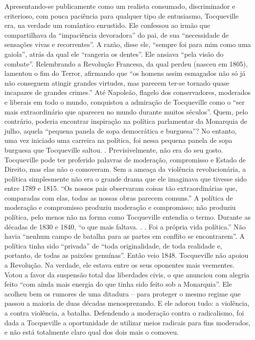 Apresentando-se publicamente como um realista consumado, discriminador e criterioso, com pouca paciência para qualquer tipo de entusiasmo, Tocqueville era, na verdade um romântico enrustido. Ele confessou ao irmão que compartilhava da “impaciência devoradora” do pai, de sua “necessidade de sensações vivas e recorrentes”. A razão, disse ele, “sempre foi para mim como uma gaiola”, atrás da qual ele “rangeria os dentes”. Ele ansiava “pela visão do combate”. Relembrando a Revolução Francesa, da qual perdeu (nasceu em 1805), lamentou o fim do Terror, afirmando que “os homens assim esmagados não só já não conseguem atingir grandes virtudes, mas parecem ter-se tornado quase incapazes de grandes crimes.” Até Napoleão, flagelo dos conservadores, moderados e liberais em todo o mundo, conquistou a admiração de Tocqueville como o “ser mais extraordinário que apareceu no mundo durante muitos séculos”. Quem, pelo contrário, poderia encontrar inspiração na política parlamentar da Monarquia de julho, aquela “pequena panela de sopa democrática e burguesa”? No entanto, uma vez iniciado uma carreira na política, foi nessa pequena panela de sopa burguesa que Tocqueville saltou. . Previsivelmente, não era do seu gosto. Tocqueville pode ter proferido palavras de moderação, compromisso e Estado de Direito, mas elas não o comoveram. Sem a ameaça da violência revolucionária, a política simplesmente não era o grande drama que ele imaginava que tivesse sido entre 1789 e 1815. “Os nossos pais observaram coisas tão extraordinárias que, comparadas com elas, todas as nossas obras parecem comuns.” A política de moderação e compromisso produziu moderação e compromisso; não produziu política, pelo menos não na forma como Tocqueville entendia o termo. Durante as décadas de 1830 e 1840, “o que mais faltava. . . Foi a própria vida política.” Não havia “nenhum campo de batalha para as partes em conflito se encontrarem”. A política tinha sido “privada” de “toda originalidade, de toda realidade e, portanto, de todas as paixões genuínas”. Então veio 1848. Tocqueville não apoiou a Revolução. Na verdade, ele estava entre os seus oponentes mais veementes. Votou a favor da suspensão total das liberdades civis, o que anunciou com alegria feito “com ainda mais energia do que tinha sido feito sob a Monarquia”. Ele acolheu bem os rumores de uma ditadura – para proteger o mesmo regime que passou a maioria de duas décadas menosprezando. E ele adorou tudo: a violência, a contra violência, a batalha. Defendendo a moderação contra o radicalismo, foi dada a Tocqueville a oportunidade de utilizar meios radicais para fins moderados, e não está totalmente claro qual dos dois mais o comoveu.
 
